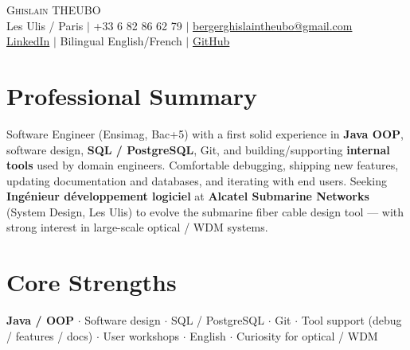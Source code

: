\documentclass[letterpaper,10.5pt]{article}
\begin{document}
\begin{center}
{\Huge \scshape Ghislain THEUBO} \\ \vspace{2pt}
\small Les Ulis / Paris $|$ +33 6 82 86 62 79 $|$ \href{mailto:bergerghislaintheubo@gmail.com}{bergerghislaintheubo@gmail.com} \\
\href{https://www.linkedin.com/in/berger-ghislain}{LinkedIn} $|$ Bilingual English/French $|$ \href{https://github.com/Bergerghislain}{GitHub}
\end{center}
\vspace{-6pt}
\section{Professional Summary}
\small{Software Engineer (Ensimag, Bac+5) with a first solid experience in \textbf{Java OOP}, software design, \textbf{SQL / PostgreSQL}, Git, and building/supporting \textbf{internal tools} used by domain engineers. Comfortable debugging, shipping new features, updating documentation and databases, and iterating with end users. Seeking \textbf{Ing\'enieur d\'eveloppement logiciel} at \textbf{Alcatel Submarine Networks} (System Design, Les Ulis) to evolve the submarine fiber cable design tool --- with strong interest in large-scale optical / WDM systems.}
\section{Core Strengths}
\small{\textbf{Java / OOP} $\cdot$ Software design $\cdot$ SQL / PostgreSQL $\cdot$ Git $\cdot$ Tool support (debug / features / docs) $\cdot$ User workshops $\cdot$ English $\cdot$ Curiosity for optical / WDM}
\end{document}

